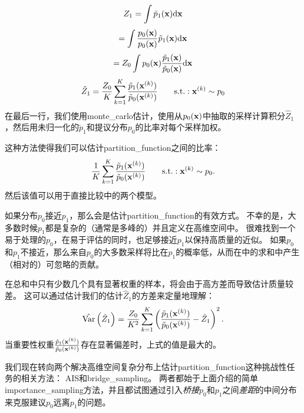 
\begin{equation}
	Z_1 = \int \tilde{p}_1 (\mathbf{x}) \mathrm{d} \mathbf{x} 
\end{equation}
\begin{equation}
	= \int  \frac{ p_0(\mathbf{x}) }{ p_0(\mathbf{x}) }   \tilde{p}_1 (\mathbf{x}) \mathrm{d} \mathbf{x} 
\end{equation}
\begin{equation}
	= Z_0 \int  p_0(\mathbf{x})   \frac{ \tilde{p}_1 (\mathbf{x}) }{ \tilde{p}_0 (\mathbf{x}) } \mathrm{d} \mathbf{x} 
\end{equation}
\begin{equation}
\label{eq:18.44}
	\hat{Z}_1 = \frac{Z_0}{K} \sum_{k=1}^K \frac{ \tilde{p}_1(\mathbf{x}^{(k)})  }{ \tilde{p}_0(\mathbf{x}^{(k)}) }  \quad\quad \text{s.t.}: \mathbf{x}^{(k)} \sim p_0
\end{equation}
在最后一行，我们使用\gls{monte_carlo}估计，使用从$p_0(\mathbf{x})$中抽取的采样计算积分$\hat{Z}_1$，然后用未归一化的$\tilde{p}_1$和提议分布$p_0$的比率对每个采样加权。


这种方法使得我们可以估计\gls{partition_function}之间的比率：
\begin{equation}
	\frac{1}{K} \sum_{k=1}^K \frac{ \tilde{p}_1 (\mathbf{x}^{(k)}) }{ \tilde{p}_0 (\mathbf{x}^{(k)}) }
	\quad\quad \text{s.t.}: \mathbf{x}^{(k)} \sim p_0.
\end{equation}
然后该值可以用于直接比较中的两个模型。


如果分布$p_0$接近$p_1$，那么会是估计\gls{partition_function}的有效方式\citep{Minka_2005}。
不幸的是，大多数时候$p_1$都是复杂的（通常是多峰的）并且定义在高维空间中。
很难找到一个易于处理的$p_0$，在易于评估的同时，也足够接近$p_1$以保持高质量的近似。
如果$p_0$和$p_1$不接近，那么来自$p_0$的大多数采样将比在$p_1$的概率低，从而在中的求和中产生（相对的）可忽略的贡献。


在总和中只有少数几个具有显著权重的样本，将会由于高方差而导致估计质量较差。
这可以通过估计我们的估计$\hat{Z}_1$的方差来定量地理解：
\begin{equation}
	\hat{\text{Var}} \left( \hat{Z}_1 \right)  = \frac{Z_0 }{K^2} \sum_{k=1}^K
\left(  \frac{ \tilde{p}_1(\mathbf{x}^{(k)}) }{  \tilde{p}_0(\mathbf{x}^{(k)}) } - \hat{Z}_1  \right)^2.
\end{equation}
当重要性权重$\frac{ \tilde{p}_1(\mathbf{x}^{(k)}) }{ \tilde{p}_0(\mathbf{x}^{(k)}) } $存在显著偏差时，上式的值是最大的。


我们现在转向两个解决高维空间复杂分布上估计\gls{partition_function}这种挑战性任务的相关方法：
\gls{AIS}和\gls{bridge_sampling}。
两者都始于上面介绍的简单\gls{importance_sampling}方法，并且都试图通过引入\emph{桥接}$p_0$和$p_1$之间\emph{差距}的中间分布来克服建议$p_0$远离$p_1$的问题。


